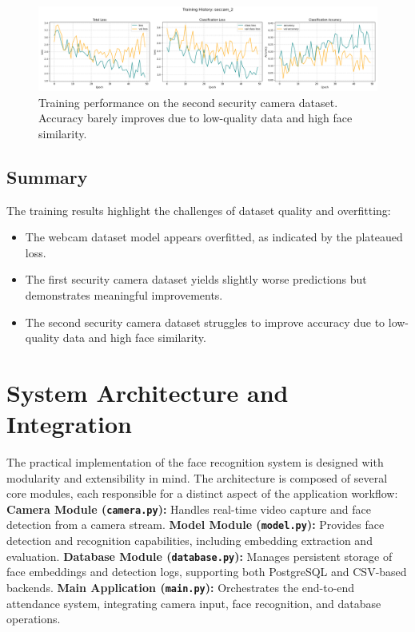 \begin{figure}[ht!]
    \centering
    \includegraphics[width=\textwidth]{../Files/training_seccam_2.png}
    \caption{Training performance on the second security camera dataset. Accuracy barely improves due to low-quality data and high face similarity.}
    \label{fig:training-seccam-2}
\end{figure}

\subsection{Summary}
The training results highlight the challenges of dataset quality and overfitting:
\begin{itemize}
    \item The webcam dataset model appears overfitted, as indicated by the plateaued loss.
    \item The first security camera dataset yields slightly worse predictions but demonstrates meaningful improvements.
    \item The second security camera dataset struggles to improve accuracy due to low-quality data and high face similarity.
\end{itemize}

\section{System Architecture and Integration}

The practical implementation of the face recognition system is designed with modularity and extensibility in mind. The architecture is composed of several core modules, each responsible for a distinct aspect of the application workflow:
\textbf{Camera Module (\texttt{camera.py}):} Handles real-time video capture and face detection from a camera stream.
\textbf{Model Module (\texttt{model.py}):} Provides face detection and recognition capabilities, including embedding extraction and evaluation.
\textbf{Database Module (\texttt{database.py}):} Manages persistent storage of face embeddings and detection logs, supporting both PostgreSQL and CSV-based backends.
\textbf{Main Application (\texttt{main.py}):} Orchestrates the end-to-end attendance system, integrating camera input, face recognition, and database operations.

